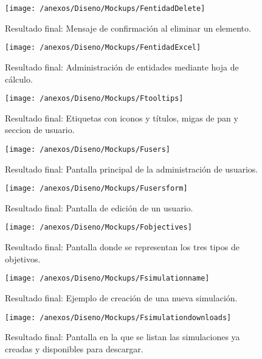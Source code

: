 \begin{figure}[h]
	\centering
	\texttt{[image: /anexos/Diseno/Mockups/FentidadDelete]}
	\caption{Resultado final: Mensaje de confirmación al eliminar un elemento.}
	\label{img:FentidadDelete}
\end{figure}

\begin{figure}[h]
	\centering
	\texttt{[image: /anexos/Diseno/Mockups/FentidadExcel]}
	\caption{Resultado final: Administración de entidades mediante hoja de cálculo.}
	\label{img:FentidadExcel}
\end{figure}

\begin{figure}[h]
	\centering
	\texttt{[image: /anexos/Diseno/Mockups/Ftooltips]}
	\caption{Resultado final: Etiquetas con iconos y títulos, migas de pan y seccion de usuario.}
	\label{img:Ftooltips}
\end{figure}

\begin{figure}[h]
	\centering
	\texttt{[image: /anexos/Diseno/Mockups/Fusers]}
	\caption{Resultado final: Pantalla principal de la administración de usuarios.}
	\label{img:Fusers}
\end{figure}

\begin{figure}[h]
	\centering
	\texttt{[image: /anexos/Diseno/Mockups/Fusersform]}
	\caption{Resultado final: Pantalla de edición de un usuario.}
	\label{img:Fusersform}
\end{figure}

\begin{figure}[h]
	\centering
	\texttt{[image: /anexos/Diseno/Mockups/Fobjectives]}
	\caption{Resultado final: Pantalla donde se representan los tres tipos de objetivos.}
	\label{img:Fobjectives}
\end{figure}

\begin{figure}[h]
	\centering
	\texttt{[image: /anexos/Diseno/Mockups/Fsimulationname]}
	\caption{Resultado final: Ejemplo de creación de una nueva simulación.}
	\label{img:Fsimulationname}
\end{figure}

\begin{figure}[h]
	\centering
	\texttt{[image: /anexos/Diseno/Mockups/Fsimulationdownloads]}
	\caption{Resultado final: Pantalla en la que se listan las simulaciones ya creadas y disponibles para descargar.}
	\label{img:Fsimulationdownloads}
\end{figure}